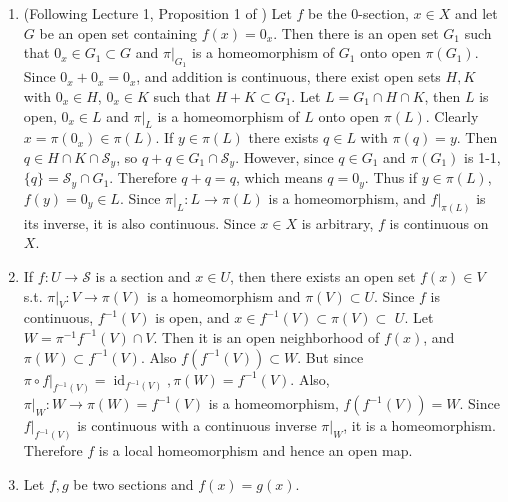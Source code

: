 \begin{enumerate}
\item (Following Lecture 1, Proposition 1 of \cite{6}) 
Let $f$ be the $0$-section, $x \in X$ and let $G$ be an open set containing $f(x)=0_{x}$. 
Then there is an open set $G_{1}$ such that $0_{x} \in G_{1} \subset G$ and $\pi|_{G_{1}}$ is a homeomorphism of $G_{1}$ onto open $\pi(G_{1})$. 
Since $0_{x}+0_{x}=0_{x}$, and addition is continuous, 
there exist open sets $H, K$ with $0_{x} \in H$, $0_{x} \in K$ such that $H+K \subset G_{1}$. 
Let $L=G_{1} \cap H \cap K$, then $L$ is open, $0_{x} \in L$ and $\pi|_{L}$ is a homeomorphism of $L$ onto open $\pi(L)$. 
Clearly $x=\pi(0_{x}) \in \pi(L)$. If $y \in \pi(L)$ there exists $q \in L$ with $\pi(q)=y$. 
Then $q \in H \cap K \cap \mathcal{S}_{y}$, so $q+q \in G_{1} \cap \mathcal{S}_{y}$. 
However, since $q \in G_{1}$ and $\pi(G_{1})$ is 1-1, $\{q\}=\mathcal{S}_{y} \cap G_{1}$. 
Therefore $q+q=q$, which means $q=0_{y}$. 
Thus if $y \in \pi(L)$, $f(y)=0_{y} \in L$. 
Since $\pi|_{L}\colon L \rightarrow \pi(L)$ is a homeomorphism, 
and $f|_{\pi(L)}$ is its inverse, it is also continuous. 
Since $x \in X$ is arbitrary, $f$ is continuous on $X$.
\item If $f\colon U \rightarrow \mathcal{S}$ is a section and $x \in U$, 
then there exists an open set $f(x) \in V$ s.t. $\pi|_{V}\colon V \rightarrow \pi(V)$ is a homeomorphism and $\pi(V) \subset U$. 
Since $f$ is continuous, $f^{-1}(V)$ is open, and $x \in f^{-1}(V) \subset \pi(V) \subset$ $U$. 
Let $W=\pi^{-1} f^{-1}(V) \cap V$. Then it is an open neighborhood of $f(x)$, 
and $\pi(W) \subset f^{-1}(V)$. Also $f(f^{-1}(V)) \subset W$. 
But since $\pi \circ f|_{f^{-1}(V)}=\operatorname{id}_{f^{-1}(V)}, \pi(W)=f^{-1}(V)$. 
Also, $\pi|_{W}\colon W \rightarrow \pi(W)=f^{-1}(V)$ is a homeomorphism, $f(f^{-1}(V))=W$. 
Since $f|_{f^{-1}(V)}$ is continuous with a continuous inverse $\pi|_{W}$, it is a homeomorphism. 
Therefore $f$ is a local homeomorphism and hence an open map.
\item Let $f, g$ be two sections and $f(x)=g(x)$. 

\end{enumerate}
